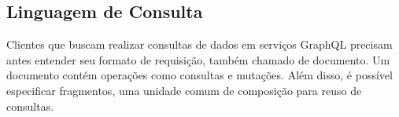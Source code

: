 \subsection[Linguagem de Consulta]{Linguagem de Consulta}

Clientes que buscam realizar consultas de dados em serviços GraphQL precisam antes entender seu formato de requisição, também chamado de documento. Um documento contém operações como consultas e mutações. Além disso, é possível especificar fragmentos, uma unidade comum de composição para reuso de consultas. \cite{GraphQL2016}



